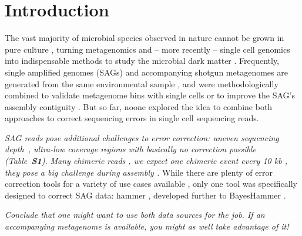\documentclass{bioinfo}
\begin{document}
\vspace{-1em}

\section{Introduction}

The vast majority of microbial species observed in nature cannot be grown in pure culture \citep{rappe}, turning metagenomics and -- more recently -- single cell genomics into indispensable methods to study the microbial dark matter \citep{mdm}.
Frequently, single amplified genomes (SAGs) and accompanying shotgun metagenomes are generated from the same environmental sample \citep{mason, op9}, and were methodologically combined to validate metagenome bins with single cells \citep{cowrumen} or to improve the SAG's assembly contiguity \citep{sr1}.
But so far, noone explored the idea to combine both approaches to correct sequencing errors in single cell sequencing reads.

\textit{SAG reads pose additional challenges to error correction: uneven sequencing depth~\citep{chitsaz}, ultra-low coverage regions with basically no correction possible (Table~\textbf{S1}).} %
\textit{Many chimeric reads \citep{lasken}, we expect one chimeric event every 10 kb \citep{rodrigue}, they pose a big challenge during assembly \citep{spades2}.} %
While there are plenty of error correction tools for a variety of use cases available \citep{david}, only one tool was specifically designed to correct SAG data: hammer \citep{hammer}, developed further to BayesHammer \citep{bayeshammer}.

\textit{Conclude that one might want to use both data sources for the job. If an accompanying metagenome is available, you might as well take advantage of it!}

\vspace{-1em}
\end{document}

